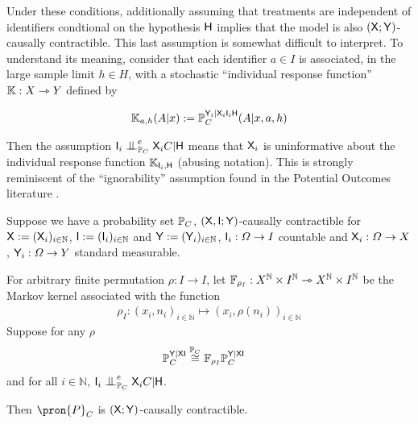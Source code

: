 Under these conditions, additionally assuming that treatments are independent of identifiers condtional on the hypothesis $\mathsf{H}$ implies that the model is also $(\mathsf{X};\mathsf{Y})$-causally contractible. This last assumption is somewhat difficult to interpret. To understand its meaning, consider that each identifier $a\in I$ is associated, in the large sample limit $h\in H$, with a stochastic ``individual response function'' $\mathbb{K}: X\rightarrowtriangle Y$ defined by

\begin{align}
    \mathbb{K}_{a,h}(A|x) := \mathbb{P}_C^{\mathsf{Y}_i|\mathsf{X}_i\mathsf{I}_i\mathsf{H}}(A|x,a,h)
\end{align}

Then the assumption $\RV{I}_i\CI^e_{\prob{P}_C} \RV{X}_iC|\RV{H}$ means that $\mathsf{X}_i$ is uninformative about the individual response function $\mathbb{K}_{\mathsf{I}_i,\mathsf{H}}$ (abusing notation). This is strongly reminiscent of the ``ignorability'' assumption found in the Potential Outcomes literature \citep{rubin_causal_2005}.

\begin{theorem}\label{th:cc_ind_treat}
Suppose we have a probability set $\mathbb{P}_C$, $(\mathsf{X},\mathsf{I};\mathsf{Y})$-causally contractible for $\mathsf{X}:=(\mathsf{X}_i)_{i\in \mathbb{N}}$, $\mathsf{I}:=(\mathsf{I}_i)_{i\in \mathbb{N}}$ and $\mathsf{Y}:=(\mathsf{Y}_i)_{i\in\mathbb{N}}$, $\mathsf{I}_i:\Omega\to I$ countable and $\mathsf{X}_i:\Omega\to X$, $\mathsf{Y}_i:\Omega\to Y$ standard measurable.

For arbitrary finite permutation $\rho:I\to I$, let $\mathbb{F}_{\rho_I}:X^\mathbb{N}\times I^{\mathbb{N}}\rightarrowtriangle X^\mathbb{N}\times I^{\mathbb{N}}$ be the Markov kernel associated with the function 
\begin{align}
    \rho_I:(x_i,n_i)_{i\in\mathbb{N}}\mapsto (x_i,\rho(n_i))_{i\in \mathbb{N}}
\end{align}
Suppose for any $\rho$
\begin{align}
    \mathbb{P}_C^{\mathsf{Y}|\mathsf{XI}}&\overset{\mathbb{P}_C}{\cong} \mathbb{F}_{\rho_I}\mathbb{P}_C^{\mathsf{Y}|\mathsf{XI}}
\end{align}
and for all $i\in \mathbb{N}$, $\RV{I}_i\CI^e_{\prob{P}_C} \RV{X}_i C|\RV{H}$. 

Then $\pron{P}_C$ is $(\mathsf{X};\mathsf{Y})$-causally contractible.
\end{theorem}

